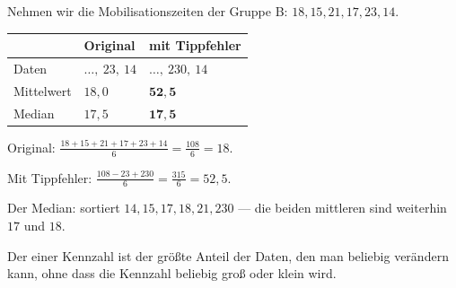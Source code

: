 \begin{merksatz}
Nehmen wir die Mobilisationszeiten der Gruppe B: $18, 15, 21, 17, 23, 14$.

\begin{center}
\renewcommand{\arraystretch}{1.48}
\begin{tabular}{@{}P{3.0cm}P{2.2cm}P{2.6cm}@{}}
\toprule
& \textbf{Original} & \textbf{mit Tippfehler}\\
\midrule
Daten & $\ldots,\ 23,\ 14$ & $\ldots,\ 230,\ 14$\\
Mittelwert & $18{,}0$ & \textcolor{akzent}{$\mathbf{52{,}5}$}\\
Median & $17{,}5$ & \textcolor{gruen}{$\mathbf{17{,}5}$}\\
\bottomrule
\end{tabular}
\end{center}

Original: $\frac{18+15+21+17+23+14}{6} = \frac{108}{6} = 18$.

Mit Tippfehler: $\frac{108 - 23 + 230}{6} = \frac{315}{6} = 52{,}5$.

Der Median: sortiert $14, 15, 17, 18, 21, 230$ --- die beiden mittleren sind weiterhin $17$ und $18$.

\begin{center}
\begin{minipage}{0.88\textwidth}
\end{minipage}
\end{center}
\end{merksatz}

\begin{definition}
Der  einer Kennzahl ist der größte Anteil der Daten, den man beliebig verändern kann, ohne dass die Kennzahl beliebig groß oder klein wird.
\end{definition}

